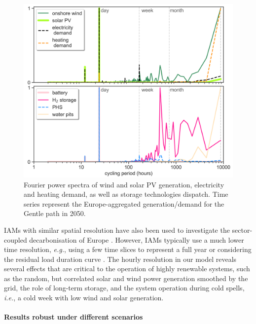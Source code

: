 \documentclass[5p]{elsarticle} %
\begin{document}
\begin{figure}[!h]
\centering
\includegraphics[width=\columnwidth]{figures/Fourier.png}
\caption{Fourier power spectra of wind and solar PV generation, electricity and heating demand, as well as storage technologies dispatch. Time series represent the Europe-aggregated generation/demand for the Gentle path in 2050.} \label{fig_Fourier} 
\end{figure}

IAMs with similar spatial resolution have also been used to investigate the sector-coupled decarbonisation of Europe \cite{in-depth_2018, JRC-EU-TIMES, Creutzig_2017}. However, IAMs typically use a much lower time resolution, \textit{e.g.}, using a few time slices to represent a full year \cite{JRC-EU-TIMES, Loffler_2019, Poncelet_2016, McGlade_2015, Babrowski_2014} or considering the residual load duration curve \cite{Creutzig_2017, Ueckerdt_2017}. The hourly resolution in our model reveals several effects that are critical to the operation of highly renewable systems, such as the random, but correlated solar and wind power generation smoothed by the grid, the role of long-term storage, and the system operation during cold spells, \textsl{i.e.}, a cold week with low wind and solar generation.

 
\paragraph{\textbf{Results robust under different scenarios}} \
\end{document}
